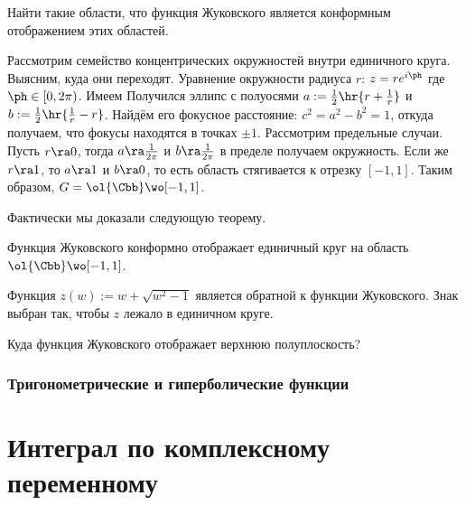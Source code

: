 \documentclass[a4paper]{article}
\begin{document}
\begin{solution}
\begin{problem}
Найти такие области, что функция Жуковского является конформным отображением этих областей.
\end{problem}
\begin{solution}
Рассмотрим семейство концентрических окружностей внутри единичного круга. Выясним, куда они переходят.
Уравнение окружности радиуса $r$: $z = re^{i\ph}$ где $\ph \in [0,2\pi)$. Имеем
Получился эллипс  с полуосями $a := \frac12\hr{r + \frac{1}{r}}$ и $b := \frac12\hr{\frac{1}{r} - r}$.
Найдём его фокусное расстояние: $c^2 = a^2 - b^2 = 1$, откуда получаем, что фокусы находятся в точках
$\pm 1$. Рассмотрим предельные случаи. Пусть $r \ra 0$, тогда $a \ra \frac{1}{2\pi}$ и $b \ra \frac{1}{2\pi}$
в пределе получаем окружность. Если же $r \ra 1$, то $a \ra 1$ и $b \ra 0$, то есть область стягивается к отрезку $[-1,1]$.
Таким образом, $G = \ol{\Cbb} \wo [-1,1]$.
\end{solution}

Фактически мы доказали следующую теорему.

\begin{theorem}
Функция Жуковского конформно отображает единичный круг на область $\ol{\Cbb} \wo [-1,1]$.
\end{theorem}

Функция $z(w) := w + \sqrt{w^2 - 1}$ является обратной к функции Жуковского. Знак выбран так, чтобы $z$ лежало
в единичном круге.

\begin{problem}
Куда функция Жуковского отображает верхнюю полуплоскость?
\end{problem}

\subsubsection{Тригонометрические и гиперболические функции}

\begin{df}
\end{df}

\begin{df}
\end{df}

\section{Интеграл по комплексному переменному}


\end{solution}
\end{document}
